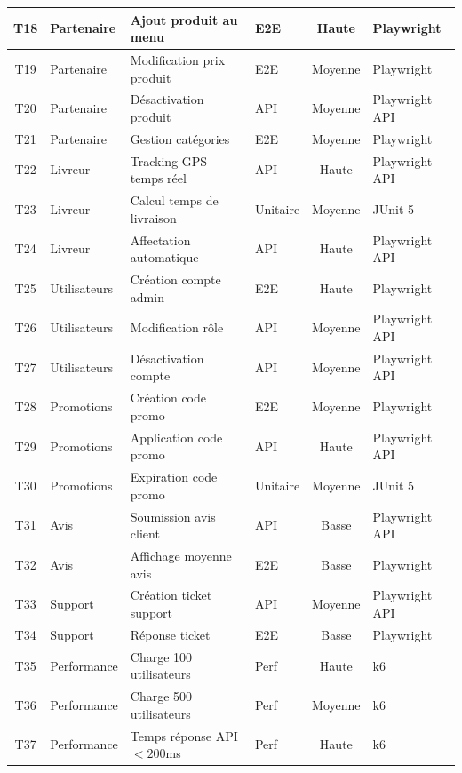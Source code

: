 \begin{longtable}{|c|l|p{4.5cm}|l|c|l|}
T18 & Partenaire & Ajout produit au menu & E2E & Haute & Playwright \\
\hline
T19 & Partenaire & Modification prix produit & E2E & Moyenne & Playwright \\
\hline
T20 & Partenaire & Désactivation produit & API & Moyenne & Playwright API \\
\hline
T21 & Partenaire & Gestion catégories & E2E & Moyenne & Playwright \\
\hline

T22 & Livreur & Tracking GPS temps réel & API & Haute & Playwright API \\
\hline
T23 & Livreur & Calcul temps de livraison & Unitaire & Moyenne & JUnit 5 \\
\hline
T24 & Livreur & Affectation automatique & API & Haute & Playwright API \\
\hline

T25 & Utilisateurs & Création compte admin & E2E & Haute & Playwright \\
\hline
T26 & Utilisateurs & Modification rôle & API & Moyenne & Playwright API \\
\hline
T27 & Utilisateurs & Désactivation compte & API & Moyenne & Playwright API \\
\hline

T28 & Promotions & Création code promo & E2E & Moyenne & Playwright \\
\hline
T29 & Promotions & Application code promo & API & Haute & Playwright API \\
\hline
T30 & Promotions & Expiration code promo & Unitaire & Moyenne & JUnit 5 \\
\hline

T31 & Avis & Soumission avis client & API & Basse & Playwright API \\
\hline
T32 & Avis & Affichage moyenne avis & E2E & Basse & Playwright \\
\hline

T33 & Support & Création ticket support & API & Moyenne & Playwright API \\
\hline
T34 & Support & Réponse ticket & E2E & Basse & Playwright \\
\hline

T35 & Performance & Charge 100 utilisateurs & Perf & Haute & k6 \\
\hline
T36 & Performance & Charge 500 utilisateurs & Perf & Moyenne & k6 \\
\hline
T37 & Performance & Temps réponse API $< 200$ms & Perf & Haute & k6 \\
\hline


\end{longtable}

